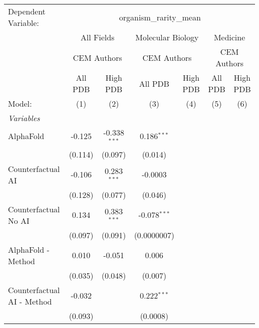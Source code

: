 \begingroup
\centering
\begin{tabular}{lcccccc}
   \tabularnewline \midrule \midrule
   Dependent Variable: & \multicolumn{6}{c}{organism\_rarity\_mean}\\
 & \multicolumn{2}{c}{All Fields} & \multicolumn{2}{c}{Molecular Biology} & \multicolumn{2}{c}{Medicine} \\
\cmidrule(lr){2-3} \cmidrule(lr){4-5} \cmidrule(lr){6-7}
 & \multicolumn{2}{c}{CEM Authors} & \multicolumn{2}{c}{CEM Authors} & \multicolumn{2}{c}{CEM Authors} \\
\cmidrule(lr){2-3} \cmidrule(lr){4-5} \cmidrule(lr){6-7}
 & \multicolumn{1}{c}{All PDB} & \multicolumn{1}{c}{High PDB} & \multicolumn{1}{c}{All PDB} & \multicolumn{1}{c}{High PDB} & \multicolumn{1}{c}{All PDB} & \multicolumn{1}{c}{High PDB} \\
\cmidrule(lr){2-2} \cmidrule(lr){3-3} \cmidrule(lr){4-4} \cmidrule(lr){5-5} \cmidrule(lr){6-6} \cmidrule(lr){7-7}
   Model:                                & (1)       & (2)            & (3)            & (4) & (5) & (6)\\  
   \midrule
   \emph{Variables}\\
   AlphaFold                             & -0.125    & -0.338$^{***}$ & 0.186$^{***}$  &     &     &   \\   
                                         & (0.114)   & (0.097)        & (0.014)        &     &     &   \\   
   Counterfactual AI                     & -0.106    & 0.283$^{***}$  & -0.0003        &     &     &   \\   
                                         & (0.128)   & (0.077)        & (0.046)        &     &     &   \\   
   Counterfactual No AI                  & 0.134     & 0.383$^{***}$  & -0.078$^{***}$ &     &     &   \\   
                                         & (0.097)   & (0.091)        & (0.0000007)    &     &     &   \\   
   AlphaFold - Method                    & 0.010     & -0.051         & 0.006          &     &     &   \\   
                                         & (0.035)   & (0.048)        & (0.007)        &     &     &   \\   
   Counterfactual AI - Method            & -0.032    &                & 0.222$^{***}$  &     &     &   \\   
                                         & (0.093)   &                & (0.0008)       &     &     &   \\   

\end{tabular}

